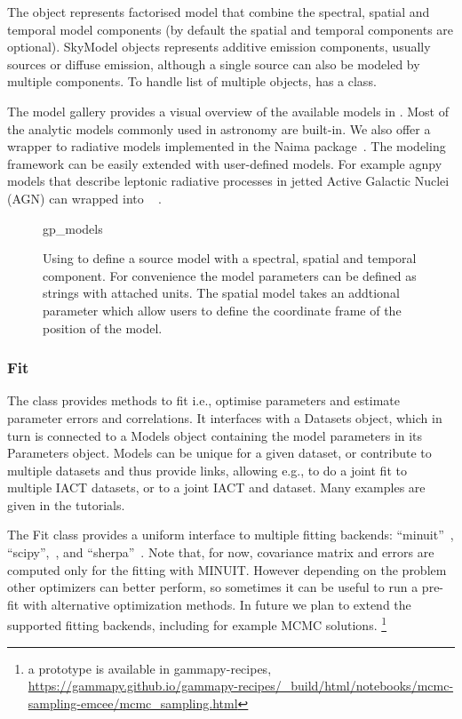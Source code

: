 The  object represents factorised model that combine the spectral,
spatial and temporal model components (by default the spatial and temporal components are
optional). SkyModel objects represents additive emission components, usually
sources or diffuse emission, although a single source can also be modeled by
multiple components. To handle list of multiple  objects, \gammapy
has a  class.

The model gallery provides a visual overview of the available models in
\gammapy. Most of the analytic models  commonly used in \gammaray astronomy are
built-in. We also offer a wrapper to radiative models implemented in the Naima
package~\cite{naima}. The modeling framework can be easily extended with
user-defined models. For example agnpy models that describe leptonic radiative
processes in jetted Active Galactic Nuclei (AGN) can wrapped into
\gammapy~\citep[see section3.5 of ][]{2021arXiv211214573N} .

\begin{figure}
	{gp_models}
	\caption{Using  to define a source model with a
    spectral, spatial and temporal component. For convenience the model
    parameters can be defined as strings with attached units. The spatial model
    takes an addtional  parameter which allow users to define
    the coordinate frame of the position of the model.
    }
	\label{fig*:minted:gp_models}
\end{figure}

\subsubsection{Fit}
\label{sssec:fit}

The  class provides methods to fit i.e., optimise parameters and estimate
parameter errors and correlations. It interfaces with a Datasets object, which
in turn is connected to a Models object containing the model parameters in its
Parameters object. Models can be unique for a given dataset, or contribute to
multiple datasets and thus provide links, allowing e.g., to do a joint fit to
multiple IACT datasets, or to a joint IACT and \fermi dataset. Many
examples are given in the tutorials.


The Fit class provides a uniform interface to multiple fitting backends:
“minuit”~\citep{iminuit}, “scipy”,~\citep{2020SciPy-NMeth}, and
“sherpa”~\citep{sherpa-2005,sherpa-2011}. Note that, for now, covariance matrix
and errors are computed only for the fitting with MINUIT. However depending on
the problem other optimizers can better perform, so sometimes it can be useful
to run a pre-fit with alternative optimization methods. In future we plan to
extend the supported fitting backends, including for example MCMC solutions.
\footnote{a prototype is available in gammapy-recipes,
	\url{https://gammapy.github.io/gammapy-recipes/_build/html/notebooks/mcmc-sampling-emcee/mcmc_sampling.html}
}
